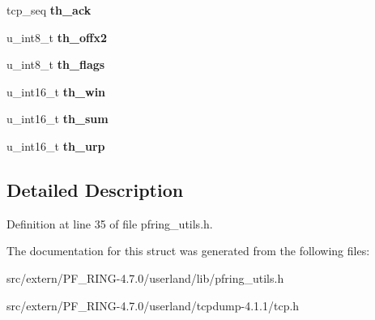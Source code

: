 \begin{DoxyCompactItemize}
\item 
\hypertarget{structtcphdr_acd398bfab077875fb1a723285dd7baa9}{
tcp\_\-seq {\bfseries th\_\-ack}}
\label{structtcphdr_acd398bfab077875fb1a723285dd7baa9}

\item 
\hypertarget{structtcphdr_aac3e453c71dedefe5e45a11cd18c8c86}{
u\_\-int8\_\-t {\bfseries th\_\-offx2}}
\label{structtcphdr_aac3e453c71dedefe5e45a11cd18c8c86}

\item 
\hypertarget{structtcphdr_a86d5f73908e0db169e66540b0c4919cc}{
u\_\-int8\_\-t {\bfseries th\_\-flags}}
\label{structtcphdr_a86d5f73908e0db169e66540b0c4919cc}

\item 
\hypertarget{structtcphdr_aa7c3f1128b72e3cd5f42b6314efb797e}{
u\_\-int16\_\-t {\bfseries th\_\-win}}
\label{structtcphdr_aa7c3f1128b72e3cd5f42b6314efb797e}

\item 
\hypertarget{structtcphdr_a4f4d06da84fccca5d316f5795397bd02}{
u\_\-int16\_\-t {\bfseries th\_\-sum}}
\label{structtcphdr_a4f4d06da84fccca5d316f5795397bd02}

\item 
\hypertarget{structtcphdr_a0da342586d97bfcb8cb295f32fb0653e}{
u\_\-int16\_\-t {\bfseries th\_\-urp}}
\label{structtcphdr_a0da342586d97bfcb8cb295f32fb0653e}

\end{DoxyCompactItemize}


\subsection{Detailed Description}


Definition at line 35 of file pfring\_\-utils.h.



The documentation for this struct was generated from the following files:\begin{DoxyCompactItemize}
\item 
src/extern/PF\_\-RING-\/4.7.0/userland/lib/pfring\_\-utils.h\item 
src/extern/PF\_\-RING-\/4.7.0/userland/tcpdump-\/4.1.1/tcp.h\end{DoxyCompactItemize}
